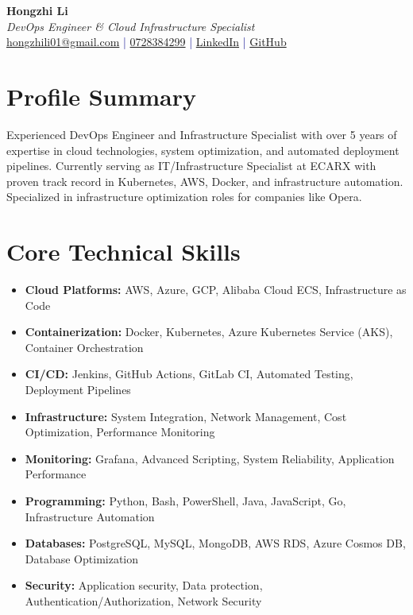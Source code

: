 \documentclass[11pt,a4paper]{article}
\begin{document}
\pagestyle{empty} %

\begin{center}
{\LARGE \textbf{Hongzhi Li}}\\[10pt]
{\Large \textit{DevOps Engineer \& Cloud Infrastructure Specialist}}\\[10pt]
\textcolor{darkblue}{\href{mailto:hongzhili01@gmail.com}{hongzhili01@gmail.com} | \href{tel:0728384299}{0728384299} | \href{https://www.linkedin.com/in/hzl/}{LinkedIn} | \href{https://github.com/bluehawana}{GitHub}}
\end{center}

\section*{Profile Summary}
Experienced DevOps Engineer and Infrastructure Specialist with over 5 years of expertise in cloud technologies, system optimization, and automated deployment pipelines. Currently serving as IT/Infrastructure Specialist at ECARX with proven track record in Kubernetes, AWS, Docker, and infrastructure automation. Specialized in infrastructure optimization roles for companies like Opera.

\section*{Core Technical Skills}
\begin{itemize}[noitemsep]
\item \textbf{Cloud Platforms:} AWS, Azure, GCP, Alibaba Cloud ECS, Infrastructure as Code
\item \textbf{Containerization:} Docker, Kubernetes, Azure Kubernetes Service (AKS), Container Orchestration
\item \textbf{CI/CD:} Jenkins, GitHub Actions, GitLab CI, Automated Testing, Deployment Pipelines
\item \textbf{Infrastructure:} System Integration, Network Management, Cost Optimization, Performance Monitoring
\item \textbf{Monitoring:} Grafana, Advanced Scripting, System Reliability, Application Performance
\item \textbf{Programming:} Python, Bash, PowerShell, Java, JavaScript, Go, Infrastructure Automation
\item \textbf{Databases:} PostgreSQL, MySQL, MongoDB, AWS RDS, Azure Cosmos DB, Database Optimization
\item \textbf{Security:} Application security, Data protection, Authentication/Authorization, Network Security
\end{itemize}
\end{document}
